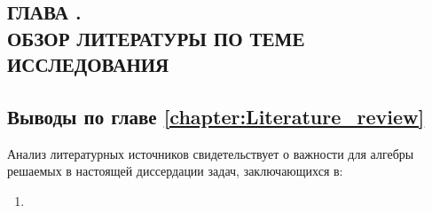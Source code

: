 \documentclass[_00_dissertation.tex]{subfiles}
\begin{document}
\onlyinsubfile{
    \renewcommand{\contentsname}{ОГЛАВЛЕНИЕ}
    \setcounter{tocdepth}{3}
    \tableofcontents
}

\begin{center}
    \chapter*{ГЛАВА .\\ ОБЗОР ЛИТЕРАТУРЫ ПО ТЕМЕ ИССЛЕДОВАНИЯ}\label{chapter:Literature_review}
\end{center}

\section*{Выводы по главе \ref{chapter:Literature_review}}

Анализ литературных источников свидетельствует о важности для алгебры решаемых в настоящей диссердации задач, заключающихся в:
\begin{enumerate}
    \item 
\end{enumerate}

\onlyinsubfile{
    
    
}
\end{document}
